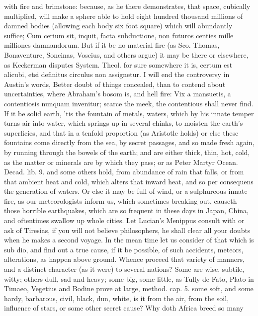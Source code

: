 {with fire and brimstone: because, as he there demonstrates, that space,
cubically multiplied, will make a sphere able to hold eight hundred
thousand millions of damned bodies (allowing each body six foot square)
which will abundantly suffice; Cum cerium sit, inquit, facta
subductione, non futuros centies mille milliones damnandorum. But if it
be no material fire (as Sco. Thomas, Bonaventure, Soncinas, Voscius,
and others argue) it may be there or elsewhere, as Keckerman disputes
System. Theol. for sure somewhere it is, certum est alicubi, etsi
definitus circulus non assignetur. I will end the controversy in
Austin's words, Better doubt of things concealed, than to contend
about uncertainties, where Abraham's bosom is, and hell fire: Vix
a mansuetis, a contentiosis nunquam invenitur; scarce the meek, the
contentious shall never find. If it be solid earth, 'tis the fountain
of metals, waters, which by his innate temper turns air into water,
which springs up in several chinks, to moisten the earth's superficies,
and that in a tenfold proportion (as Aristotle holds) or else these
fountains come directly from the sea, by secret passages, and so
made fresh again, by running through the bowels of the earth; and are
either thick, thin, hot, cold, as the matter or minerals are by which
they pass; or as Peter Martyr Ocean. Decad. lib. 9. and some others
hold, from  abundance of rain that falls, or from that ambient
heat and cold, which alters that inward heat, and so per consequens the
generation of waters. Or else it may be full of wind, or a sulphureous
innate fire, as our meteorologists inform us, which sometimes breaking
out, causeth those horrible earthquakes, which are so frequent in these
days in Japan, China, and oftentimes swallow up whole cities. Let
Lucian's Menippus consult with or ask of Tiresias, if you will not
believe philosophers, he shall clear all your doubts when he makes a
second voyage.
In the mean time let us consider of that which is sub dio, and find out
a true cause, if it be possible, of such accidents, meteors,
alterations, as happen above ground. Whence proceed that variety of
manners, and a distinct character (as it were) to several nations? Some
are wise, subtile, witty; others dull, sad and heavy; some big, some
little, as Tully de Fato, Plato in Timaeo, Vegetius and Bodine prove at
large, method. cap. 5. some soft, and some hardy, barbarous, civil,
black, dun, white, is it from the air, from the soil, influence of
stars, or some other secret cause? Why doth Africa breed so many
}
